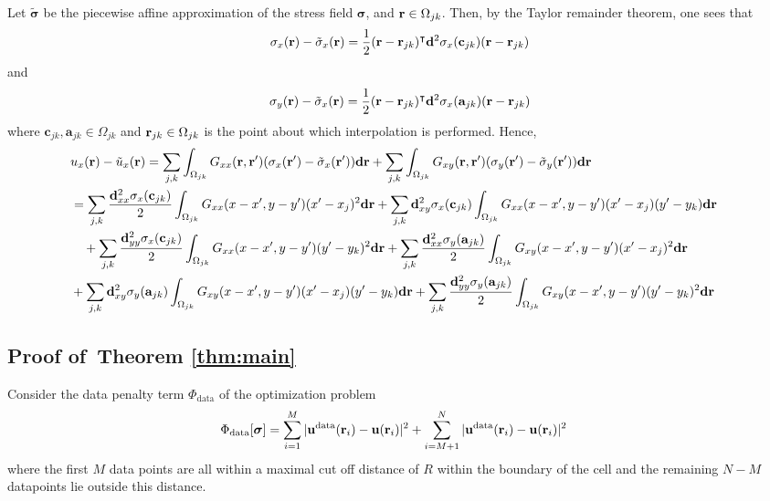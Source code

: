 \documentclass[aps,prl,reprint,twocolumn,groupedaddress,showpacs]{revtex4-1}
\newcommand{\bsigma}{{\boldsymbol\sigma}}
\def\d{{\bf d}}
\def\r{{\bf r}}
\def\u{{\bf u}}
\newcommand{\bs}{\boldsymbol{\sigma}}
\begin{document}
\begin{widetext}
Let $\tilde{\bsigma}$ be the piecewise affine approximation of the stress field $\bsigma$, and $\r\in\Omega_{jk}$. Then,
by the Taylor remainder theorem, one sees that
$$
\sigma_{x}(\r) - \tilde{\sigma}_x(\r) = \frac{1}{2}(\r-\r_{jk})^\intercal\d^2\sigma_{x}(\mathbf{c}_{jk})(\r-\r_{jk})
$$
and
$$
\sigma_{y}(\r) - \tilde{\sigma}_x(\r) = \frac{1}{2}(\r-\r_{jk})^\intercal\d^2\sigma_{x}(\mathbf{a}_{jk})(\r-\r_{jk})
$$
where $\mathbf{c}_{jk},\mathbf{a}_{jk}\in\Omega_{jk}$ and $\r_{jk}\in\Omega_{jk}$ is the point about which interpolation is performed.
Hence,
{\small
\begin{align}
\lefteqn{u_x(\r) - \tilde{u}_x(\r)  = \sum_{j,k}\int_{\Omega_{jk}} G_{xx} (\r,\r')(\sigma_{x}(\r') - \tilde{\sigma}_x(\r')) \d\r 
 +\sum_{j,k}\int_{\Omega_{jk}} G_{xy} (\r,\r')(\sigma_{y}(\r') - \tilde{\sigma}_y(\r')) \d\r } \nonumber\\
&= \sum_{j,k} \frac{\d_{xx}^2\sigma_x(\mathbf{c}_{jk})}{2}\int_{\Omega_{jk}} G_{xx}(x-x',y-y')  (x'-x_j)^2 \d\r + \sum_{j,k} {\d_{xy}^2\sigma_x(\mathbf{c}_{jk})}\int_{\Omega_{jk}} G_{xx}(x-x',y-y')  (x'-x_j)(y'-y_k)\d\r \nonumber\\
&\quad + \sum_{j,k} \frac{\d_{yy}^2\sigma_x(\mathbf{c}_{jk})}{2}\int_{\Omega_{jk}} G_{xx}(x-x',y-y')  (y'-y_k)^2\d\r   + \sum_{j,k} \frac{\d_{xx}^2\sigma_y(\mathbf{a}_{jk})}{2}\int_{\Omega_{jk}} G_{xy}(x-x',y-y')  (x'-x_j)^2\d\r \nonumber\\
&  + \sum_{j,k} {\d_{xy}^2\sigma_y(\mathbf{a}_{jk})}\int_{\Omega_{jk}} G_{xy}(x-x',y-y')  (x'-x_j)(y'-y_k)\d\r + \sum_{j,k} \frac{\d_{yy}^2\sigma_y(\mathbf{a}_{jk})}{2}\int_{\Omega_{jk}} G_{xy}(x-x',y-y')  (y'-y_k)^2\d\r 
\end{align}
}

\subsection{Proof of~Theorem \ref{thm:main}}

Consider the data penalty term $\Phi_{\textrm{data}}$ of the optimization problem
\begin{align*}
\Phi_{\rm data}[\bs] &=\sum_{i=1}^{M}\vert \u^{\rm
  data}(\r_{i})- \u(\r_i)\vert^{2}  + \sum_{i=M+1}^{N}\vert \u^{\rm
  data}(\r_{i})- \u(\r_i)\vert^{2} 
\end{align*}
where the first $M$ data points are all within a maximal cut off distance of $R$ within the boundary of the cell and the remaining $N-M$ datapoints lie outside this distance.
\end{widetext}



\end{document}
